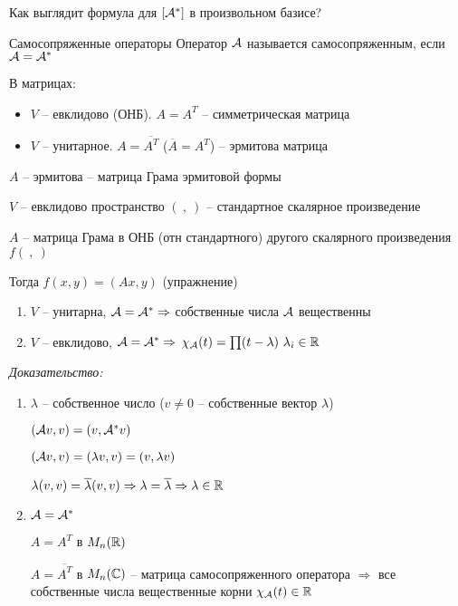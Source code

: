 \documentclass[12pt]{article}
\begin{document}
\begin{Exercise}{}
    Как выглядит формула для $[\mathcal{A}^*]$ в произвольном базисе?
\end{Exercise}

\begin{defin}{Самосопряженные операторы}
    Оператор $\mathcal{A}$ называется самосопряженным, если $\mathcal{A} = \mathcal{A}^*$

    В матрицах: 
    
    \begin{itemize}
        \item $V$ -- евклидово (ОНБ). $A = A^T$ -- симметрическая матрица
        \item $V$ -- унитарное. $A = \overline{A^T}$ ($\overline{A} = A^T$) -- эрмитова матрица
    \end{itemize} 
\end{defin}

\begin{Remark}{}
    $A$ -- эрмитова -- матрица Грама эрмитовой формы
\end{Remark}

\begin{Remark}{}
    $V$ -- евклидово пространство $(\ , \ )$ -- стандартное скалярное произведение 

    $A$ -- матрица Грама в ОНБ (отн стандартного) другого скалярного произведения $f(\ , \ )$

    Тогда $f(x, y) = (Ax, y)$ (упражнение)
\end{Remark}

\begin{lem}{}
    \begin{enumerate}
        \item $V$ -- унитарна, $\mathcal{A} = \mathcal{A}^* \Rightarrow$ собственные числа $\mathcal{A}$ вещественны
        \item $V$ -- евклидово, $\mathcal{A} = \mathcal{A}^* \Rightarrow$ $\chi_{\mathcal{A}}(t) = \prod(t - \lambda)\ \lambda_i \in \mathbb R$
    \end{enumerate}
\end{lem}

\textit{Доказательство:}

\begin{enumerate}
    \item $\lambda$ -- собственное число ($v \neq 0$ -- собственные вектор $\lambda$)
    
    $(\mathcal{A} v, v) = (v, \mathcal{A}^* v)$

    $(\mathcal{A} v, v) = (\lambda v, v) = (v, \lambda v)$

    $\lambda(v, v) = \overline{\lambda}(v, v) \Rightarrow \lambda = \overline{\lambda} \Rightarrow \lambda \in \mathbb R$

    \item $\mathcal{A} = \mathcal{A}^*$
    
    $A = A^T$ в $M_n(\mathbb R)$

    $A = \overline{A^T}$ в $M_n(\mathbb C)$ -- матрица самосопряженного оператора $\Rightarrow$ все собственные числа вещественные корни $\chi_{\mathcal{A}}(t) \in \mathbb R$
\end{enumerate}
\end{document}
